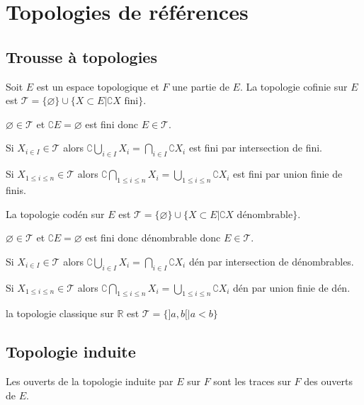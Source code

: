 \documentclass[a4paper, 11pt, french]{book}
\newenvironment{itemise}{\itemize}{\enditemize}
\theoremstyle{plain} %
\theoremstyle{definition} %
\theoremstyle{remark} %
\newcommand{\1}{\mathds{1}}
\newcommand\vide{\varnothing}
\newcommand{\infegal}{\leqslant}
\newcommand{\R}{\mathbb{R}}
\begin{document}
\chapter{Topologies de références}

\section{Trousse à topologies}
Soit $E$ est un espace topologique et $F$ une partie de $E$.
\proposition
La topologie cofinie sur $E$ est $\mathscr{T}=\{\vide\}\cup\{X\subset E|\complement X\text{ fini}\}$.\demonstration
\begin{itemise}
	\item $\vide\in\mathscr{T}$ et $\complement E=\vide$ est fini donc $E\in\mathscr{T}$.
	\item Si $X_{i\in I}\in\mathscr{T}$ alors $\complement\bigcup_{i\in I}X_i=\bigcap_{i\in I}\complement X_i$ est fini par intersection de fini.
	\item Si $X_{1\infegal i\infegal n}\in\mathscr{T}$ alors $\complement\bigcap_{1\infegal i\infegal n}X_i=\bigcup_{1\infegal i\infegal n}\complement X_i$ est fini par union finie de finis.
\end{itemise}

\proposition
La topologie codén sur $E$ est $\mathscr{T}=\{\vide\}\cup\{X\subset E|\complement X\text{ dénombrable}\}$.\demonstration
\begin{itemise}
	\item $\vide\in\mathscr{T}$ et $\complement E=\vide$ est fini donc dénombrable donc $E\in\mathscr{T}$.
	\item Si $X_{i\in I}\in\mathscr{T}$ alors $\complement\bigcup_{i\in I}X_i=\bigcap_{i\in I}\complement X_i$ dén par intersection de dénombrables.
	\item Si $X_{1\infegal i\infegal n}\in\mathscr{T}$ alors $\complement\bigcap_{1\infegal i\infegal n}X_i=\bigcup_{1\infegal i\infegal n}\complement X_i$ dén par union finie de dén.
\end{itemise}

\proposition
la topologie classique sur $\R$ est $\mathscr{T}=\{]a, b[|a<b\}$

\section{Topologie induite}

\proposition
Les ouverts de la topologie induite par $E$ sur $F$ sont les traces sur $F$ des ouverts de $E$.
\end{document}
